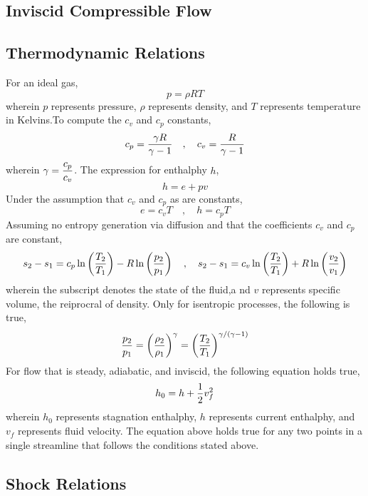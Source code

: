 \documentclass[a4paper, 12pt]{report}
\begin{document}
\begin{center}
\chapter{Inviscid Compressible Flow}
\begin{comment}
\end{comment}
\section{Thermodynamic Relations}
\begin{comment}
\end{comment}
For an ideal gas, 
$$p = \rho R T$$ 
wherein $p$ represents pressure, $\rho$ represents density, and $T$ represents temperature in Kelvins.To compute the $c_v$ and $c_p$ constants,
$$c_p = \frac{\gamma R}{\gamma - 1}\quad,\quad c_v = \frac{R}{\gamma-1}$$
wherein $\displaystyle{\gamma= \frac{c_p}{c_v}}$. The expression for enthalphy $h$,
$$h = e + pv$$
Under the assumption that $c_v$ and $c_p$ as are constants,
$$e = c_v T\quad,\quad h = c_p T$$
Assuming no entropy generation via diffusion and that the coefficients $c_v$ and $c_p$ are constant,
$$s_2-s_1 = c_p\ln\left(\frac{T_2}{T_1}\right)-R\ln\left(\frac{p_2}{p_1}\right) \quad,\quad s_2-s_1 = c_v\ln\left(\frac{T_2}{T_1}\right) + R\ln\left(\frac{v_2}{v_1}\right)$$
wherein the subscript denotes the state of the fluid,a nd $v$ represents specific volume, the reiprocral of density. Only for isentropic processes, the following is true,
$$\frac{p_2}{p_1} = \left(\frac{\rho_2}{\rho_1}\right)^\gamma = \left(\frac{T_2}{T_1}\right)^{\gamma/(\gamma-1)}$$
For flow that is steady, adiabatic, and inviscid, the following equation holds true,
$$h_0 = h + \frac{1}{2}v_f^2$$
wherein $h_0$ represents stagnation enthalphy, $h$ represents current enthalphy, and $v_f$ represents fluid velocity. The equation above holds true for any two points in a single streamline that follows the conditions stated above.
\section{Shock Relations}
\begin{comment}
\end{comment}

\end{center}
\end{document}
